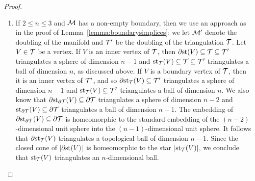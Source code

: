 \documentclass[10pt,letterpaper]{article}
\begin{document}
\begin{proof}
\begin{enumerate}
    \item 
    If $2 \leq n \leq 3$ and ${\mathcal M}$ has a non-empty boundary, then we use an approach as in the proof of Lemma~\ref{lemma:boundarysimplices}: 
    we let ${\mathcal M}'$ denote the doubling of the manifold and ${\mathcal T}'$ be the doubling of the triangulation ${\mathcal T}$. 
    Let $V \in {\mathcal T}$ be a vertex. 
    If $V$ is an inner vertex of ${\mathcal T}$, then ${\partial \rm st}(V) \subseteq {\mathcal T} \subseteq {\mathcal T}'$ triangulates a sphere of dimension $n-1$ and $\operatorname{st}_{{\mathcal T}}(V) \subseteq {\mathcal T} \subseteq {\mathcal T}'$ triangulates a ball of dimension $n$, as discussed above. 
    If $V$ is a boundary vertex of ${\mathcal T}$, then it is an inner vertex of ${\mathcal T}'$,
    and so ${\partial \rm st}_{{\mathcal T}}(V) \subseteq {\mathcal T}'$ triangulates a sphere of dimension $n-1$ and $\operatorname{st}_{{\mathcal T}}(V) \subseteq {\mathcal T}'$ triangulates a ball of dimension $n$.
    We also know that ${\partial \rm st}_{\partial{\mathcal T}}(V) \subseteq \partial{\mathcal T}$ triangulates a sphere of dimension $n-2$ and $\operatorname{st}_{\partial{\mathcal T}}(V) \subseteq \partial{\mathcal T}$ triangulates a ball of dimension $n-1$. 
    The embedding of ${\partial \rm st}_{\partial{\mathcal T}}(V) \subseteq \partial{\mathcal T}$ is homeomorphic to the standard embedding of the $(n-2)$-dimensional unit sphere into the $(n-1)$-dimensional unit sphere. 
    It follows that ${\partial \rm st}_{{\mathcal T}}(V)$ triangulates a topological ball of dimension $n-1$.
    Since the closed cone of $\left| {\partial \rm st}(V) \right|$ is homeomorphic to the star $\left| \operatorname{st}_{{\mathcal T}}(V) \right|$, we conclude that $\operatorname{st}_{{\mathcal T}}(V)$ triangulates an $n$-dimensional ball. 
    

\end{enumerate}
\end{proof}
\end{document}
